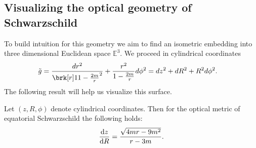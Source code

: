 \subsection{Visualizing the optical geometry of Schwarzschild}
To build intuition for this geometry we aim to find an isometric embedding into three dimensional Euclidean space $\mathbb{E}^3$. We proceed in cylindrical coordinates
\begin{align*}
\fermat &= \frac{dr^2}{\brk[r]1{1 - \frac{2m}{r}}^2} + \frac{r^2}{1 - \frac{2m}{r}} d\phi^2 = dz^2 + dR^2 + R^2 d\phi^2.
\end{align*}
The following result will help us visualize this surface.
%
\begin{proposition}[]\label{prop:derivatives-embed}
Let $(z, R, \phi)$ denote cylindrical coordinates. Then for the optical metric of equatorial Schwarzschild the following holds:
\begin{equation}\label{}
\diff{z}{R} = \frac{\sqrt{4mr-9m^2}}{r-3m}.
\end{equation}
\end{proposition}
%
